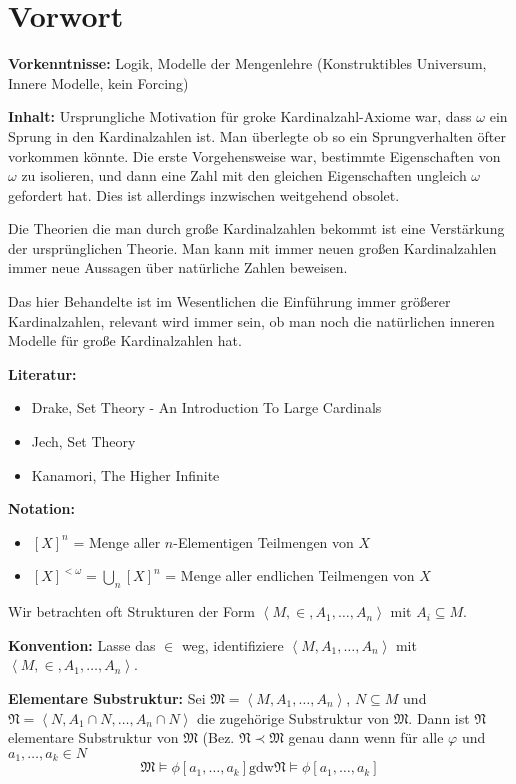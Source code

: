 \documentclass[a4paper,fontsize=11pt]{scrartcl}
\begin{document}
\flushleft
\section*{Vorwort}
{\bf Vorkenntnisse:} Logik, Modelle der Mengenlehre (Konstruktibles
Universum, Innere Modelle, kein Forcing)

{\bf Inhalt:} Ursprungliche Motivation für groke Kardinalzahl-Axiome
war, dass $\omega$ ein Sprung in den Kardinalzahlen ist. Man überlegte
ob so ein Sprungverhalten öfter vorkommen könnte. Die erste
Vorgehensweise war, bestimmte Eigenschaften von $\omega$ zu isolieren,
und dann eine Zahl mit den gleichen Eigenschaften ungleich $\omega$
gefordert hat. Dies ist allerdings inzwischen weitgehend obsolet.

Die Theorien die man durch große Kardinalzahlen bekommt ist eine
Verstärkung der ursprünglichen Theorie. Man kann mit immer neuen
großen Kardinalzahlen immer neue Aussagen über natürliche Zahlen
beweisen.

Das hier Behandelte ist im Wesentlichen die Einführung immer größerer
Kardinalzahlen, relevant wird immer sein, ob man noch die natürlichen
inneren Modelle für große Kardinalzahlen hat.

{\bf Literatur:}
\begin{itemize}
  \item Drake, Set Theory - An Introduction To Large Cardinals
  \item Jech, Set Theory
  \item Kanamori, The Higher Infinite
\end{itemize}

{\bf Notation:}
\begin{itemize}
  \item $[X]^n$ = Menge aller $n$-Elementigen Teilmengen von $X$
  \item $[X]^{<\omega} = \bigcup_n[X]^n$ = Menge aller endlichen
    Teilmengen von $X$
\end{itemize}

Wir betrachten oft Strukturen der Form
$\left<M,\in,A_1,\ldots,A_n\right>$ mit $A_i\subseteq M$.

{\bf Konvention:} Lasse das $\in$ weg, identifiziere
$\left<M,A_1,\ldots,A_n\right>$ mit
$\left<M,\in,A_1,\ldots,A_n\right>$.

{\bf Elementare Substruktur:} Sei
$\mathfrak{M}=\left<M,A_1,\ldots,A_n\right>$, $N\subseteq M$ und
$\mathfrak{N}=\left<N,A_1\cap N,\ldots,A_n\cap N\right>$ die
zugehörige Substruktur von $\mathfrak{M}$. Dann ist $\mathfrak{N}$
elementare Substruktur von $\mathfrak{M}$
(Bez. $\mathfrak{N}\prec\mathfrak{M}$ genau dann wenn für alle
$\varphi$ und $a_1,\ldots,a_k\in N$
$$ \mathfrak{M}\models \phi[a_1,\ldots,a_k] \mbox{gdw}
\mathfrak{N}\models\phi[a_1,\ldots,a_k]$$
\end{document}
